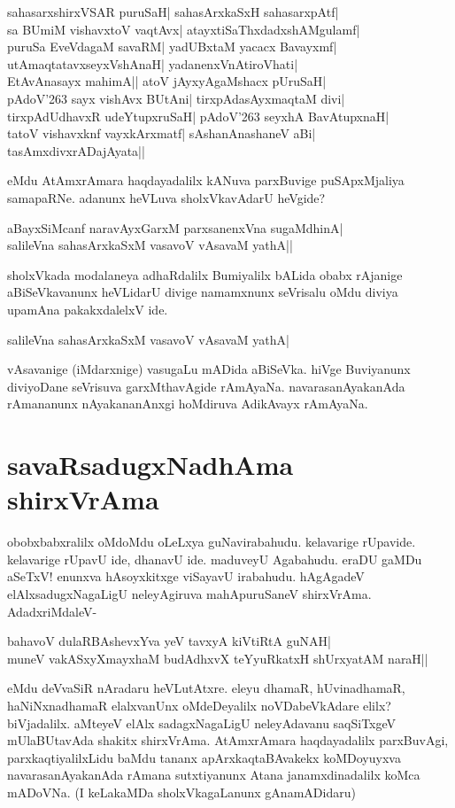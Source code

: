 \begin{shloka}
sahasarxshirxVSAR puruSaH| sahasArxkaSxH sahasarxpAtf|\label{218a}\\
sa BUmiM vishavxtoV vaqtAvx| atayxtiSaThxdadxshAMgulamf|\\
puruSa EveVdagaM savaRM| yadUBxtaM yacacx Bavayxmf|\\
utAmaqtatavxseyxVshAnaH| yadanenxVnAtiroVhati|\\
EtAvAnasayx mahimA|| atoV jAyxyAgaMshacx pUruSaH|\\
pAdoV\char'263 sayx vishAvx BUtAni|  tirxpAdasAyxmaqtaM divi|\\
tirxpAdUdhavxR udeYtupxruSaH| pAdoV\char'263 seyxhA BavAtupxnaH|\\
tatoV vishavxknf vayxkArxmatf| sAshanAnashaneV aBi|\\
tasAmxdivxrADajAyata||
\end{shloka}
eMdu AtAmxrAmara haqdayadalilx kANuva parxBuvige puSApxMjaliya samapaRNe. adanunx heVLuva sholxVkavAdarU heVgide?

\begin{shloka}
aBayxSiMcanf naravAyxGarxM parxsanenxVna sugaMdhinA|\\
salileVna sahasArxkaSxM vasavoV vAsavaM yathA||
\end{shloka}

sholxVkada modalaneya adhaRdalilx Bumiyalilx bALida obabx rAjanige aBiSeVkavanunx heVLidarU divige namamxnunx seVrisalu oMdu diviya upamAna pakakxdalelxV ide.

\begin{shloka}
salileVna sahasArxkaSxM vasavoV vAsavaM yathA|\\
\end{shloka}
vAsavanige (iMdarxnige) vasugaLu mADida aBiSeVka. hiVge Buviyanunx diviyoDane seVrisuva garxMthavAgide rAmAyaNa. navarasanAyakanAda rAmananunx nAyakananAnxgi hoMdiruva AdikAvayx rAmAyaNa. 

\section*{savaRsadugxNadhAma shirxVrAma}

obobxbabxralilx oMdoMdu oLeLxya guNavirabahudu. kelavarige rUpavide. kelavarige rUpavU ide, dhanavU ide. maduveyU Agabahudu. eraDU gaMDu aSeTxV! enunxva hAsoyxkitxge viSayavU irabahudu. hAgAgadeV elAlxsadugxNagaLigU neleyAgiruva mahApuruSaneV shirxVrAma. AdadxriMdaleV-

\begin{shloka}
bahavoV dulaRBAshevxYva yeV tavxyA kiVtiRtA guNAH|\label{219a}\\
muneV vakASxyXmayxhaM budAdhxvX teYyuRkatxH shUrxyatAM naraH||
\end{shloka}
eMdu deVvaSiR nAradaru heVLutAtxre. eleyu dhamaR, hUvinadhamaR, haNiNxnadhamaR elalxvanUnx oMdeDeyalilx noVDabeVkAdare elilx? biVjadalilx. aMteyeV elAlx sadagxNagaLigU neleyAdavanu saqSiTxgeV mUlaBUtavAda shakitx shirxVrAma. AtAmxrAmara haqdayadalilx parxBuvAgi, parxkaqtiyalilxLidu baMdu tananx apArxkaqtaBAvakekx koMDoyuyxva navarasanAyakanAda rAmana sutxtiyanunx Atana janamxdinadalilx koMca mADoVNa. (I keLakaMDa sholxVkagaLanunx gAnamADidaru)

